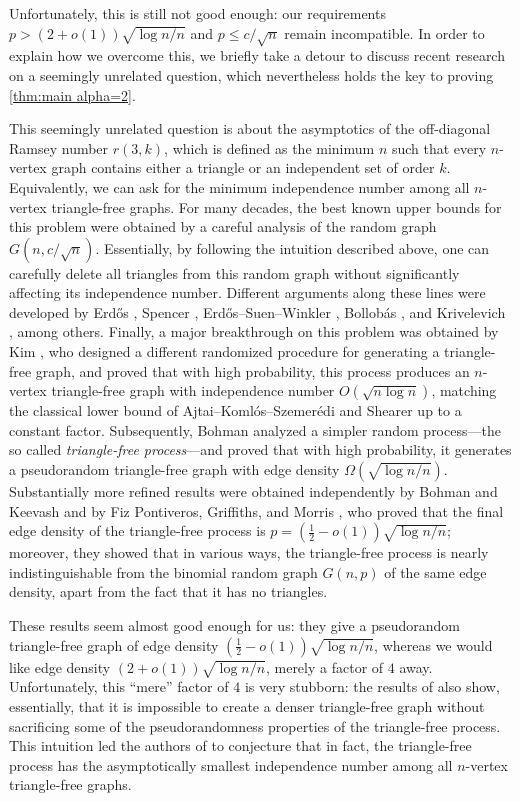 \documentclass[11pt,reqno,oneside]{amsart}
\theoremstyle{definition}
\newcommand\1{\mathbf{1}}
\let\leq\leqslant
\begin{document}
Unfortunately, this is still not good enough: our requirements $p > (2+o(1))\sqrt{\log n/n}$ and $p \leq c/\sqrt n$ remain incompatible. In order to explain how we overcome this, we briefly take a detour to discuss recent research on a seemingly unrelated question, which nevertheless holds the key to proving \cref{thm:main alpha=2}.

This seemingly unrelated question is about the asymptotics of the off-diagonal Ramsey number $r(3,k)$, which is defined as the minimum $n$ such that every $n$-vertex graph contains either a triangle or an independent set of order $k$. Equivalently, we can ask for the minimum independence number among all $n$-vertex triangle-free graphs. For many decades, the best known upper bounds for this problem were obtained by a careful analysis of the random graph $G(n,c/\sqrt n)$. Essentially, by following the intuition described above, one can carefully delete all triangles from this random graph without significantly affecting its independence number. Different arguments along these lines were developed by Erd\H os \cite{MR120168}, Spencer \cite{MR491337}, Erd\H os--Suen--Winkler \cite{MR1370965}, Bollob\'as \cite[Chapter 12]{MR1864966}, and Krivelevich \cite{MR1369060}, among others. Finally, a major breakthrough on this problem was obtained by Kim \cite{MR1369063}, who designed a different randomized procedure for generating a triangle-free graph, and proved that with high probability, this process produces an $n$-vertex triangle-free graph with independence number $O(\sqrt{n \log n})$, matching the classical lower bound of Ajtai--Koml\'os--Szemer\'edi \cite{MR600598} and Shearer \cite{MR708165} up to a constant factor. Subsequently, Bohman \cite{MR2522430} analyzed a simpler random process---the so called \emph{triangle-free process}---and proved that with high probability, it generates a pseudorandom triangle-free graph with edge density $\Omega(\sqrt{\log n/n})$. Substantially more refined results were obtained independently by Bohman and Keevash \cite{MR4201797} and by Fiz Pontiveros, Griffiths, and Morris \cite{MR4073152}, who proved that the final edge density of the triangle-free process is $p=(\frac 12-o(1))\sqrt{\log n/n}$; moreover, they showed that in various ways, the triangle-free process is nearly indistinguishable from the binomial random graph $G(n,p)$ of the same edge density, apart from the fact that it has no triangles.

These results seem almost good enough for us: they give a pseudorandom triangle-free graph of edge density $(\frac 12-o(1))\sqrt{\log n/n}$, whereas we would like edge density $(2+o(1))\sqrt{\log n/n}$, merely a factor of $4$ away. Unfortunately, this ``mere'' factor of $4$ is very stubborn: the results of \cite{MR4201797,MR4073152} also show, essentially, that it is impossible to create a denser triangle-free graph without sacrificing some of the pseudorandomness properties of the triangle-free process. This intuition led the authors of \cite{MR4073152} to conjecture that in fact, the triangle-free process has the asymptotically smallest independence number among all $n$-vertex triangle-free graphs.
\end{document}
